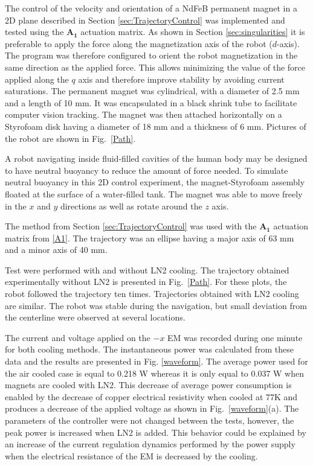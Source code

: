 The control of the velocity and orientation of a NdFeB permanent magnet in a 2D plane described in Section \ref{sec:TrajectoryControl} was implemented and tested using the $\mathbf{A_1}$ actuation matrix. As shown in Section \ref{sec:singularities} it is preferable to apply the force along the magnetization axis of the robot ($d$-axis). The program was therefore configured to orient the robot magnetization in the same direction as the applied force. This allows minimizing the value of the force applied along the $q$ axis and therefore improve stability by avoiding current saturations.
The permanent magnet was cylindrical, with a diameter of 2.5 mm and a length of 10 mm. 
It was encapsulated in a black shrink tube to facilitate computer vision tracking. 
The magnet was then attached horizontally on a Styrofoam disk having a diameter of 18 mm and a thickness of 6 mm. 
Pictures of the robot are shown in Fig.~\ref{Path}. 

A robot navigating inside fluid-filled cavities of the human body may be designed to have neutral buoyancy to reduce the amount of force needed. 
To simulate neutral buoyancy in this 2D control experiment, the magnet-Styrofoam assembly floated at the surface of a water-filled tank. The magnet was able to move freely in the $x$ and $y$ directions as well as rotate around the $z$ axis.\par
The method from Section \ref{sec:TrajectoryControl} was used with the $\mathbf{A_1}$ actuation matrix from \eqref{A1}.
 The trajectory was an ellipse having a major axis of 63 mm and a minor axis of 40 mm.

Test were performed with and without LN2 cooling. The trajectory obtained experimentally without LN2 is presented in Fig.~\ref{Path}. For these plots, the robot followed the trajectory ten times. Trajectories obtained with LN2 cooling are similar. The robot was stable during the navigation, but small deviation from the centerline were observed at several locations. 

The current and voltage applied on the $-x$ EM was recorded during one minute for both cooling methods. The instantaneous power was calculated from these data and the results are presented in Fig. \ref{waveform}. The average power used for the air cooled case is equal to 0.218 W whereas it is only equal to 0.037 W when magnets are cooled with LN2.  This decrease of average power consumption is enabled by the decrease of copper electrical resistivity when cooled at 77K and produces a decrease of the applied voltage as shown in  Fig.~\ref{waveform}(a).  The parameters of the controller were not changed between the tests, however, the peak power is increased when LN2 is added. This behavior could be explained by an increase of the current regulation dynamics performed by the power supply when the electrical resistance of the EM is decreased by the cooling. 

